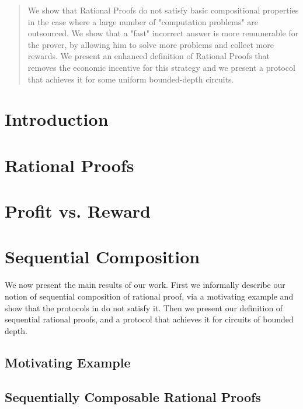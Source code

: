 \begin{abstract}
We show that Rational Proofs  do not satisfy basic compositional properties in the case where a large number of "computation problems" are outsourced. We show that a "fast" incorrect answer is more remunerable for the prover, by allowing him to solve more problems and collect more rewards.
We present an enhanced definition of Rational Proofs that removes the economic incentive  for this strategy and we present a protocol that achieves it for
some
uniform bounded-depth circuits.
\end{abstract}



\section{Introduction}


\section{Rational Proofs}


\section{Profit vs. Reward}


\section{Sequential Composition}
We now present the main results of our work. First we informally describe our notion of sequential composition of 
rational proof, via a motivating example and show that the protocols in \cite{am,am1,rosen} do not satisfy it. Then we present our definition of sequential rational proofs, and a protocol that achieves it for circuits of bounded depth. 


\subsection{Motivating Example}


\subsection{Sequentially Composable Rational Proofs}



